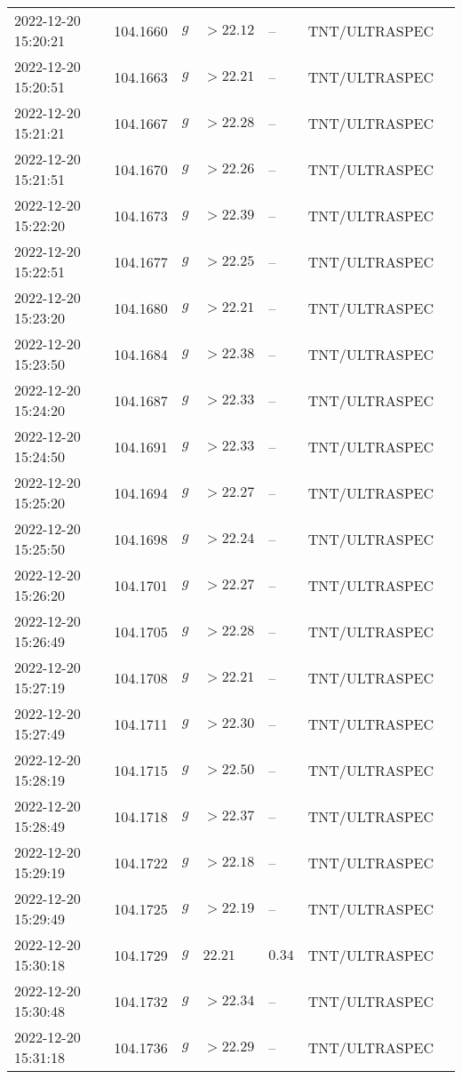\documentclass{nature_plusfigure}
\begin{document}
\begin{supplement}
\begin{center}
\begin{longtable}{lllllll}
2022-12-20 15:20:21 & 104.1660 & $g$ & $>22.12$ & -- & TNT/ULTRASPEC &  \\ 
2022-12-20 15:20:51 & 104.1663 & $g$ & $>22.21$ & -- & TNT/ULTRASPEC &  \\ 
2022-12-20 15:21:21 & 104.1667 & $g$ & $>22.28$ & -- & TNT/ULTRASPEC &  \\ 
2022-12-20 15:21:51 & 104.1670 & $g$ & $>22.26$ & -- & TNT/ULTRASPEC &  \\ 
2022-12-20 15:22:20 & 104.1673 & $g$ & $>22.39$ & -- & TNT/ULTRASPEC &  \\ 
2022-12-20 15:22:51 & 104.1677 & $g$ & $>22.25$ & -- & TNT/ULTRASPEC &  \\ 
2022-12-20 15:23:20 & 104.1680 & $g$ & $>22.21$ & -- & TNT/ULTRASPEC &  \\ 
2022-12-20 15:23:50 & 104.1684 & $g$ & $>22.38$ & -- & TNT/ULTRASPEC &  \\ 
2022-12-20 15:24:20 & 104.1687 & $g$ & $>22.33$ & -- & TNT/ULTRASPEC &  \\ 
2022-12-20 15:24:50 & 104.1691 & $g$ & $>22.33$ & -- & TNT/ULTRASPEC &  \\ 
2022-12-20 15:25:20 & 104.1694 & $g$ & $>22.27$ & -- & TNT/ULTRASPEC &  \\ 
2022-12-20 15:25:50 & 104.1698 & $g$ & $>22.24$ & -- & TNT/ULTRASPEC &  \\ 
2022-12-20 15:26:20 & 104.1701 & $g$ & $>22.27$ & -- & TNT/ULTRASPEC &  \\ 
2022-12-20 15:26:49 & 104.1705 & $g$ & $>22.28$ & -- & TNT/ULTRASPEC &  \\ 
2022-12-20 15:27:19 & 104.1708 & $g$ & $>22.21$ & -- & TNT/ULTRASPEC &  \\ 
2022-12-20 15:27:49 & 104.1711 & $g$ & $>22.30$ & -- & TNT/ULTRASPEC &  \\ 
2022-12-20 15:28:19 & 104.1715 & $g$ & $>22.50$ & -- & TNT/ULTRASPEC &  \\ 
2022-12-20 15:28:49 & 104.1718 & $g$ & $>22.37$ & -- & TNT/ULTRASPEC &  \\ 
2022-12-20 15:29:19 & 104.1722 & $g$ & $>22.18$ & -- & TNT/ULTRASPEC &  \\ 
2022-12-20 15:29:49 & 104.1725 & $g$ & $>22.19$ & -- & TNT/ULTRASPEC &  \\ 
2022-12-20 15:30:18 & 104.1729 & $g$ & $22.21$ & $0.34$ & TNT/ULTRASPEC &  \\ 
2022-12-20 15:30:48 & 104.1732 & $g$ & $>22.34$ & -- & TNT/ULTRASPEC &  \\ 
2022-12-20 15:31:18 & 104.1736 & $g$ & $>22.29$ & -- & TNT/ULTRASPEC &  \\ 

\end{longtable}
\end{center}
\end{supplement}
\end{document}
